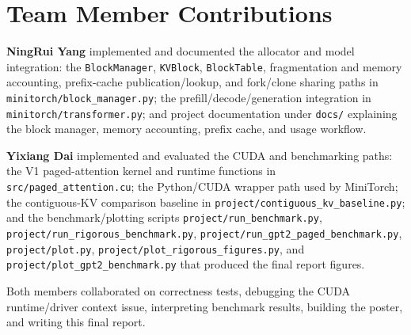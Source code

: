\documentclass{article}
\begin{document}
\section{Team Member Contributions}

\textbf{NingRui Yang} implemented and documented the allocator and model integration: the \texttt{BlockManager}, \texttt{KVBlock}, \texttt{BlockTable}, fragmentation and memory accounting, prefix-cache publication/lookup, and fork/clone sharing paths in \texttt{minitorch/block\_manager.py}; the prefill/decode/generation integration in \texttt{minitorch/transformer.py}; and project documentation under \texttt{docs/} explaining the block manager, memory accounting, prefix cache, and usage workflow.

\textbf{Yixiang Dai} implemented and evaluated the CUDA and benchmarking paths: the V1 paged-attention kernel and runtime functions in \texttt{src/paged\_attention.cu}; the Python/CUDA wrapper path used by MiniTorch; the contiguous-KV comparison baseline in \texttt{project/contiguous\_kv\_baseline.py}; and the benchmark/plotting scripts \texttt{project/run\_benchmark.py}, \texttt{project/run\_rigorous\_benchmark.py}, \texttt{project/run\_gpt2\_paged\_benchmark.py}, \texttt{project/plot.py}, \texttt{project/plot\_rigorous\_figures.py}, and \texttt{project/plot\_gpt2\_benchmark.py} that produced the final report figures.

Both members collaborated on correctness tests, debugging the CUDA runtime/driver context issue, interpreting benchmark results, building the poster, and writing this final report.



\end{document}
